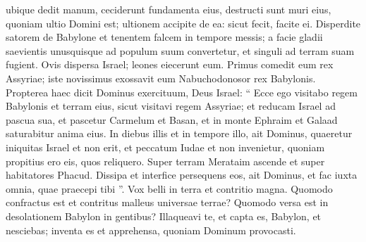 \begin{biblechapter}
\begin{biblechapter}
\begin{biblechapter}
\begin{biblechapter}
\begin{biblechapter}
\begin{biblechapter}
\begin{biblechapter}
\begin{biblechapter}
\begin{biblechapter}
\begin{biblechapter}
\begin{biblechapter}
\begin{biblechapter}
\begin{biblechapter}
\begin{biblechapter}
\begin{biblechapter}
\begin{biblechapter}
\begin{biblechapter}
\begin{biblechapter}
\begin{biblechapter}
\begin{biblechapter}
\begin{biblechapter}
\begin{biblechapter}
\begin{biblechapter}
\begin{biblechapter}
\begin{biblechapter}
\begin{biblechapter}
\begin{biblechapter}
\begin{biblechapter}
\begin{biblechapter}
\begin{biblechapter}
\begin{biblechapter}
\begin{biblechapter}
\begin{biblechapter}
\begin{biblechapter}
\begin{biblechapter}
\begin{biblechapter}
\begin{biblechapter}
\begin{biblechapter}
\begin{biblechapter}
\begin{biblechapter}
\begin{biblechapter}
\begin{biblechapter}
\begin{biblechapter}
\begin{biblechapter}
\begin{biblechapter}
\begin{biblechapter}
\begin{biblechapter}
\begin{biblechapter}
\begin{biblechapter}
\begin{biblechapter}
 ubique dedit manum,
 ceciderunt fundamenta eius,
 destructi sunt muri eius,
 quoniam ultio Domini est;
 ultionem accipite de ea:
 sicut fecit, facite ei.
 \verse Disperdite satorem de Babylone
 et tenentem falcem in tempore messis;
 a facie gladii saevientis
 unusquisque ad populum suum convertetur,
 et singuli ad terram suam fugient.
 \verse Ovis dispersa Israel;
 leones eiecerunt eum.
 Primus comedit eum rex Assyriae;
 iste novissimus exossavit eum
 Nabuchodonosor rex Babylonis.
 \verse Propterea haec dicit Dominus exercituum, Deus Israel: “ Ecce ego visitabo regem Babylonis et terram eius, sicut visitavi regem Assyriae; 
\verse et reducam Israel ad pascua sua, et pascetur Carmelum et Basan, et in monte Ephraim et Galaad saturabitur anima eius. 
\verse In diebus illis et in tempore illo, ait Dominus, quaeretur iniquitas Israel et non erit, et peccatum Iudae et non invenietur, quoniam propitius ero eis, quos reliquero.
 \verse Super terram Merataim ascende
 et super habitatores Phacud.
 Dissipa et interfice persequens eos,
 ait Dominus,
 et fac iuxta omnia, quae praecepi tibi ”.
 \verse Vox belli in terra
 et contritio magna.
 \verse Quomodo confractus est et contritus
 malleus universae terrae?
 Quomodo versa est in desolationem Babylon in gentibus?
 \verse Illaqueavi te, et capta es, Babylon,
 et nesciebas;
 inventa es et apprehensa,
 quoniam Dominum provocasti.

\end{biblechapter}
\end{biblechapter}
\end{biblechapter}
\end{biblechapter}
\end{biblechapter}
\end{biblechapter}
\end{biblechapter}
\end{biblechapter}
\end{biblechapter}
\end{biblechapter}
\end{biblechapter}
\end{biblechapter}
\end{biblechapter}
\end{biblechapter}
\end{biblechapter}
\end{biblechapter}
\end{biblechapter}
\end{biblechapter}
\end{biblechapter}
\end{biblechapter}
\end{biblechapter}
\end{biblechapter}
\end{biblechapter}
\end{biblechapter}
\end{biblechapter}
\end{biblechapter}
\end{biblechapter}
\end{biblechapter}
\end{biblechapter}
\end{biblechapter}
\end{biblechapter}
\end{biblechapter}
\end{biblechapter}
\end{biblechapter}
\end{biblechapter}
\end{biblechapter}
\end{biblechapter}
\end{biblechapter}
\end{biblechapter}
\end{biblechapter}
\end{biblechapter}
\end{biblechapter}
\end{biblechapter}
\end{biblechapter}
\end{biblechapter}
\end{biblechapter}
\end{biblechapter}
\end{biblechapter}
\end{biblechapter}
\end{biblechapter}
